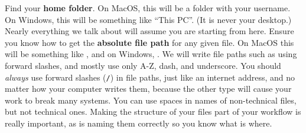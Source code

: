 
Find your \textbf{home folder}. On MacOS, this will be a folder with your username.
On Windows, this will be something like ``This PC''. (It is never your desktop.)
Nearly everything we talk about will assume you are starting from here.
Ensure you know how to get the \textbf{absolute file path} for any given file.
On MacOS this will be something like ,
and on Windows, .
We will write file paths such as 
using forward slashes, and mostly use only A-Z, dash, and underscore.
You should \textit{always} use forward slashes (\texttt{/}) in file paths,
just like an internet address, and no matter how your computer writes them,
because the other type will cause your work to break many systems.
You can use spaces in names of non-technical files, but not technical ones.
Making the structure of your files part of your workflow is really important,
as is naming them correctly so you know what is where.

